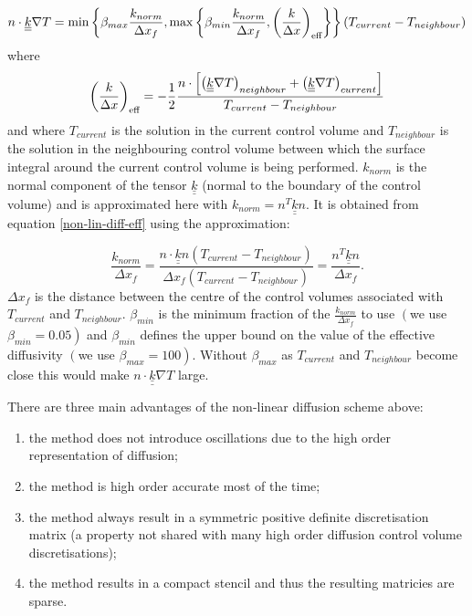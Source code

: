 \begin{equation}
n\cdot {\underline{\underline k}} \nabla T =
\min\left\{ \beta_{max}\displaystyle\frac{k_{norm}}{{\Delta x}_{f}} , \max\left\{ \beta_{min}\displaystyle\frac{k_{norm}}{{\Delta x}_{f}} , \left( \displaystyle\frac{k}{\Delta x} \right)_{\text{eff}} \right\} \right\}\left(T_{current}-T_{neighbour}\right)
\label{non-lin-diff}
\end{equation}
where
\begin{equation}
\left( \displaystyle\frac{k}{\Delta x} \right)_{\text{eff}} =
- \displaystyle\frac{1}{2} \displaystyle\frac{ n\cdot \left[ \left({\underline{\underline k}} \nabla T\right)_{neighbour} + \left({\underline{\underline k}} \nabla T\right)_{current} \right] }{T_{current}-T_{neighbour}}
\label{non-lin-diff-eff}
\end{equation}
and where $T_{current}$ is the solution in the current control volume and $T_{neighbour}$ is the solution in the neighbouring control volume between which the surface integral around the current control volume is being performed. $k_{norm}$ is the normal component of the tensor ${\underline{\underline k}}$ (normal to the boundary of the control volume) and is approximated here with $k_{norm} =n^T {\underline{\underline k}} n $.  It is obtained from equation
\ref{non-lin-diff-eff} using the approximation:

\begin{equation}
\frac{k_{norm}}{{\Delta x}_f}=
 \frac{ n\cdot {\underline{\underline k}} n (T_{current}-T_{neighbour})}{{\Delta x}_f(T_{current}-T_{neighbour})}
= \frac{n^T {\underline{\underline k}} n}{{\Delta x}_f}.
\label{non-lin-diff-eff-approx}
\end{equation}
${\Delta x}_f$ is the distance between the centre of the control volumes associated with $T_{current}$ and $T_{neighbour}$.  $\beta_{min}$ is the minimum fraction of the $\frac{k_{norm}}{{\Delta x}_{f}}$ to use $\left(\right.$we use $\beta_{min}=0.05\left.\right)$ and $\beta_{min}$ defines the upper bound on the value of the effective diffusivity $\left(\right.$we use $\beta_{max}=100\left.\right)$.  Without $\beta_{max}$ as $T_{current}$ and $T_{neighbour}$ become close this would make  $n\cdot {\underline{\underline k}} \nabla T$ large.

There are three main advantages of the non-linear diffusion scheme above:
\begin{enumerate}[1)]
\item the method does not introduce oscillations due to the high order representation of diffusion;
\item the method is high order accurate most of the time;
\item the method always result in a symmetric positive definite discretisation matrix (a property not shared with many high order diffusion control volume discretisations);
\item the method results in a compact stencil and thus the resulting matricies are sparse.
\end{enumerate}

